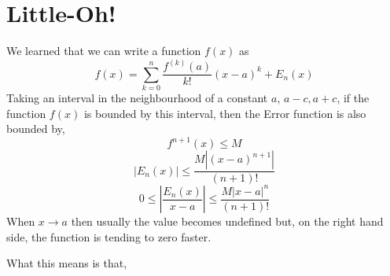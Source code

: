\documentclass[twoside]{report}
\begin{document}
\section{Little-Oh!} %
We learned that we can write a function $f(x)$ as 
\[
   f(x) = \sum_{k=0}^{n} \frac{f^{(k)}(a)}{k!}(x-a)^k + E_n(x)
\]
Taking an interval in the neighbourhood of a constant $a$, $a-c, a+c$, if the function $f(x)$ is bounded by this interval, then the Error function is also bounded by,
\[
   f^{n+1} (x) \leq M
\]
\[
   |E_n(x)| \leq \frac{M|(x-a)^{n+1}|}{(n+1)!}
\]
\[
 0 \leq  |\frac{E_n(x)}{x-a} | \leq \frac{M | x-a |^n}{(n+1)!}
\]
When $x \rightarrow a$ then usually the value becomes undefined but, on the right hand side, the function is tending to zero faster.

What this means is that,
\end{document}

